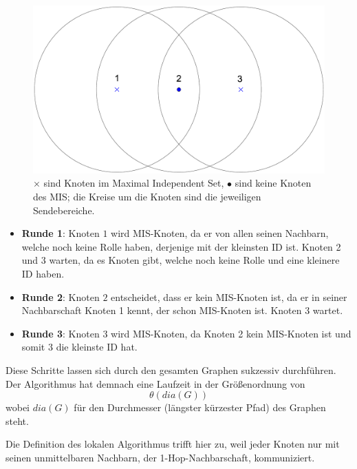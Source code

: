 \documentclass[a4paper,twoside]{IEEEtran}
\begin{document}
\begin{figure}[h!]
\centering
\includegraphics[width=0.99\linewidth]{MIS.eps}
\caption{$\times $ sind Knoten im Maximal Independent Set, $\bullet $ sind keine Knoten des MIS; die Kreise um die Knoten sind die jeweiligen Sendebereiche.}
\label{fig:MIS}
\end{figure}


\begin{itemize}
\item \textbf{Runde 1}: Knoten $1 $ wird MIS-Knoten, da er von allen seinen Nachbarn, welche noch keine Rolle haben, derjenige mit der kleinsten ID ist. Knoten 2 und 3 warten, da es Knoten gibt, welche noch keine Rolle und eine kleinere ID haben.

\item \textbf{Runde 2}: Knoten $2 $ entscheidet, dass er kein MIS-Knoten ist, da er in seiner Nachbarschaft Knoten 1 kennt, der schon MIS-Knoten ist. Knoten 3 wartet.

\item \textbf{Runde 3}: Knoten $3 $ wird MIS-Knoten, da Knoten 2 kein MIS-Knoten ist und somit 3 die kleinste ID hat. 
\end{itemize}

Diese Schritte lassen sich durch den gesamten Graphen sukzessiv durchführen. 
Der Algorithmus hat demnach eine Laufzeit in der Größenordnung von 
\begin{equation*}
\theta (dia(G)) 
\end{equation*}
wobei $dia(G) $ für den Durchmesser (längster kürzester Pfad) des Graphen steht.

Die Definition des lokalen Algorithmus trifft hier zu, weil jeder Knoten nur mit seinen unmittelbaren Nachbarn, der 1-Hop-Nachbarschaft, kommuniziert.
\end{document}
